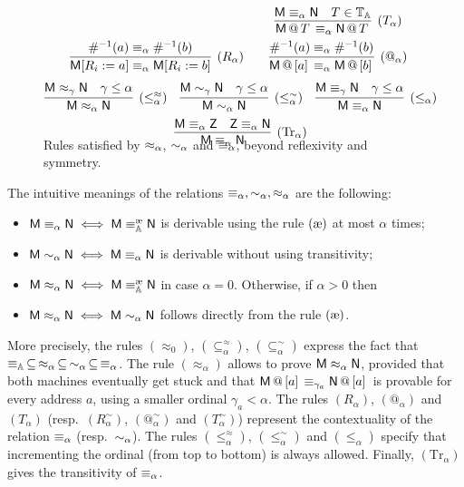 \begin{defi}
\begin{figure}
\begin{gather*}
\begin{array}{ccc}
	&&
	\infer[(T_\alpha)]{\appT{\mM}{T}\eq\appT{\mN}{T}}{\mM\eq \mN&T\in\Tapes}\\[3pt]
	\infer[(R_\alpha)]{\mM\repl{R_i}{a}\eq\mM\repl{R_i}{b}}{\Lookinv a\eq \Lookinv b}
	&&
	\infer[(@_\alpha)]{\append{\mM}{a}\eq\append{\mM}{b}}{\Lookinv a\eq \Lookinv b}\\[3pt]
\end{array}~\\
\infer[(\le^\approx_\alpha)]{\mM \pesc \mN}{\mM\pesc[\gamma]\mN&\gamma \le \alpha}
\quad
\infer[(\le^\sim_\alpha)]{\mM \svirg \mN}{\mM\svirg[\gamma]\mN&\gamma \le \alpha}
\quad
\infer[(\le_\alpha)]{\mM \eq \mN}{\mM\eq[\gamma]\mN&\gamma \le \alpha}
\\
\infer[(\mathrm{Tr}_\alpha)]{\mM \eq \mN}{\mM\eq\mZ&\mZ\eq\mN}\\[-5ex]
\end{gather*}
\caption{Rules satisfied by $\pesc$, $\svirg$ and $\eq$, beyond reflexivity and symmetry.}\label{fig:Pesiolino}
\end{figure}
\end{defi}
The intuitive meanings of the relations $\eq,\svirg,\pesc$ are the following:
\begin{itemize}
\item $\mM\eq\mN\iff\mM\equivea\mN$ is derivable using the rule $\extrule$ at most $\alpha$ times;
\item $\mM\svirg\mN\iff\mM\eq\mN$ is derivable without using transitivity;
\item $\mM\pesc\mN\iff\mM\equivea\mN$ in case $\alpha = 0$. Otherwise, if $\alpha>0$ then
\item $\mM\pesc\mN\iff\mM\svirg\mN$ follows directly from the rule $\extrule$.
\end{itemize}

\noindent
More precisely, the rules $(\approx_0)$, $(\subseteq^{\approx}_\alpha)$, $(\subseteq^{\sim}_\alpha)$ express the fact that $\equiva\,\subseteq\,\pesc\,\subseteq\,\svirg\,\subseteq\,\eq$.
The rule $(\approx_\alpha)$ allows to prove $\mM \pesc \mN$, provided that both machines eventually get stuck and that $\appT{\mM}{[a]} \eq[\gamma_a] \appT{\mN}{[a]}$ is provable for every address $a$, using a smaller ordinal $\gamma_a < \alpha$.
The rules $(R_\alpha)$, $(@_\alpha)$ and $(T_\alpha)$ (resp.\ $(R_\alpha^\sim)$, $(@_\alpha^\sim)$ and $(T_\alpha^\sim)$) represent the contextuality of the relation $\eq$ (resp.\ $\svirg$).
The rules $(\le^\approx_\alpha)$, $(\le^\sim_\alpha)$ and $(\le_\alpha)$ specify that incrementing the ordinal (from top to bottom) is always allowed.
Finally, $(\mathrm{Tr}_\alpha)$ gives the transitivity of $\eq$.

